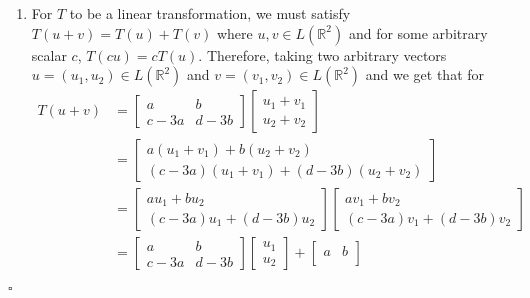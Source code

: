\documentclass[11pt]{article}
\newcommand{\R}{\mathbb{R}}
\newenvironment{proof}{\noindent{\bf Proof.}}{\hfill $\square$\medskip}
\begin{document}
\begin{proof}
    \begin{enumerate}[label=(\alph*)]
        \item For $T$ to be a linear transformation, we must satisfy $T(u+v)=T(u)+T(v)$ where
        $u,v\in L(\R^{2})$ and for some arbitrary scalar $c$, $T(cu)=cT(u)$. Therefore, taking two
        arbitrary vectors $u=(u_{1},u_{2})\in L(\R^{2})$ and $v=(v_{1},v_{2})\in L(\R^{2})$ and we get that for 
        \begin{equation}
            \begin{split}
                T(u+v)&=\begin{bmatrix}
                    a&b\\
                    c-3a&d-3b
                \end{bmatrix}\begin{bmatrix}
                    u_{1}+v_{1}\\
                    u_{2}+v_{2}
                \end{bmatrix}\\
                &=\begin{bmatrix}
                    a(u_{1}+v_{1})+b(u_{2}+v_{2})\\
                    (c-3a)(u_{1}+v_{1})+(d-3b)(u_{2}+v_{2})
                \end{bmatrix}\\
                &=\begin{bmatrix}
                    au_{1}+bu_{2}\\
                    (c-3a)u_{1}+(d-3b)u_{2}
                \end{bmatrix}\begin{bmatrix}
                    av_{1}+bv_{2}\\
                    (c-3a)v_{1}+(d-3b)v_{2}
                \end{bmatrix}\\
                &=\begin{bmatrix}
                    a&b\\
                    c-3a&d-3b
                \end{bmatrix}\begin{bmatrix}
                    u_{1}\\u_{2}
                \end{bmatrix}+
                    \begin{bmatrix}
                        a&b\\

\end{bmatrix}
\end{split}
\end{equation}
\end{enumerate}
\end{proof}
\end{document}
